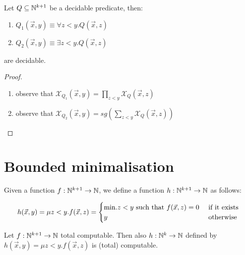 \begin{lemma}
  Let $Q\subseteq \mathbb{N}^{k+1}$ be a decidable predicate, then:
  \begin{enumerate}
  \item $Q_1(\vec{x},y) \equiv \forall z<y. Q(\vec{x},z)$
  \item $Q_2(\vec{x},y) \equiv \exists z<y. Q(\vec{x},z)$
  \end{enumerate}  
  are decidable.
\end{lemma}

\begin{proof}
  \begin{enumerate}
  \item observe that $\mathcal{X}_{Q_1}(\vec{x},y) = \prod_{z<y}\mathcal{X}_Q(\vec{x},z)$
  \item observe that $\mathcal{X}_{Q_2}(\vec{x},y) = sg(\sum_{z<y}\mathcal{X}_Q(\vec{x},z))$
  \end{enumerate}
\end{proof}

\section{Bounded minimalisation}
Given a function $f: \mathbb{N}^{k+1} \rightarrow \mathbb{N}$, we define a function $h: \mathbb{N}^{k+1} \rightarrow \mathbb{N}$ as follows:

\begin{equation*}
  h(\vec{x},y) = \mu z<y . f(\vec{x},z) =
  \begin{cases}
    $min.$z<y$ such that $ f(\vec{x},z) = 0 & $ if it exists$ \\
    y                                   & $ otherwise $
  \end{cases}
\end{equation*}


\begin{lemma}
  Let $f: \mathbb{N}^{k+1} \rightarrow \mathbb{N}$ total computable. Then also
  $h: \mathbb{N}^{k} \rightarrow \mathbb{N}$ defined by
  $h(\vec{x},y) = \mu z<y. f(\vec{x},z)$ is (total) computable.
\end{lemma}

